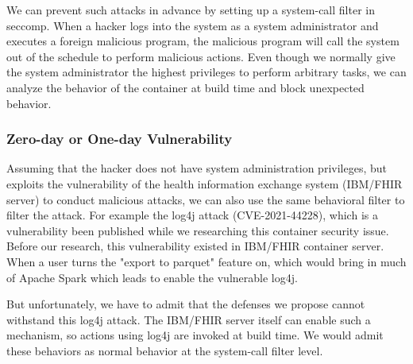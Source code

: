 We can prevent such attacks in advance by setting up a system-call filter
in seccomp. When a hacker logs into the system as a system administrator
and executes a foreign malicious program, the malicious program will call
the system out of the schedule to perform malicious actions.
Even though we normally give the system administrator the highest privileges
to perform arbitrary tasks, we can analyze the behavior of the container
at build time and block unexpected behavior.

\subsubsection{Zero-day or One-day Vulnerability}
Assuming that the hacker does not have system administration privileges,
but exploits the vulnerability of the health information exchange system
(IBM/FHIR server) to conduct malicious attacks, we can also use the same
behavioral filter to filter the attack.
For example the log4j attack (CVE-2021-44228), which is a vulnerability
been published while we researching this container security issue.
Before our research, this vulnerability existed in IBM/FHIR container server.
When a user turns the "export to parquet" feature on, which would
bring in much of Apache Spark which leads to enable the vulnerable log4j.

But unfortunately, we have to admit that the defenses we propose cannot
withstand this log4j attack. The IBM/FHIR server itself can enable such a mechanism,
so actions using log4j are invoked at build time. We would admit these
behaviors as normal behavior at the system-call filter level.




